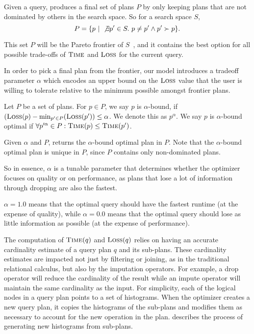 Given a query, \ProjectName{} produces a final set of plans $P$ by only keeping plans that are not dominated by others in the search space. So for a search space $S$, \[P= \{ p ~|~ \not\exists p' \in S.\ p \neq p' \land p' \succ p \}.\]
 
This set $P$ will be the Pareto frontier of $S$~\cite{pareto1964cours}, and it contains the best option for all possible trade-offs of $\textsc{Time}$ and $\textsc{Loss}$ for the current query.

In order to pick a final plan from the frontier, our model introduces a tradeoff parameter $\alpha$ which encodes an upper bound on the $\textsc{Loss}$ value that the user is willing
to tolerate relative to the minimum possible amongst frontier plans.

\begin{definition}
Let $P$ be a set of plans. For $p \in P$, we say $p$ is $\alpha$-bound, if $(\textsc{Loss}(p) - \min_{p' \in P}(\textsc{Loss}(p')) \leq \alpha$. We denote this as $p^\alpha$.
We say $p$ is $\alpha$-bound optimal if $\forall p'^\alpha \in P: \textsc{Time}(p) \leq \textsc{Time}(p')$. 
\end{definition}

Given $\alpha$ and $P$, \ProjectName{} returns the $\alpha$-bound optimal plan in $P$. Note that the $\alpha$-bound optimal plan is unique in $P$, since $P$ contains only non-dominated plans.

So in essence, $\alpha$ is a tunable parameter that determines whether the optimizer focuses on quality or on performance, as plans that
lose a lot of information through dropping are also the fastest. 

$\alpha = 1.0$ means that the optimal query should have the fastest runtime (at the expense of quality), while $\alpha=0.0$ means that the optimal query should lose
as little information as possible (at the expense of performance).

The computation of $\textsc{Time}(q)$ and $\textsc{Loss}(q)$ relies on having an accurate cardinality estimate of a query plan $q$ and its sub-plans. 
These cardinality estimates are impacted not just by filtering or joining, as in the traditional relational calculus, but also by the imputation operators.
For example, a drop operator will reduce the cardinality of the result while an impute operator will maintain the same cardinality as the input.
For simplicity, each of the logical nodes in a query plan points to a set of histograms.
When the optimizer creates a new query plan, it copies the histograms of the sub-plans and modifies them as necessary to account for the new operation in the plan.
 describes the process of generating new histograms from sub-plans.

